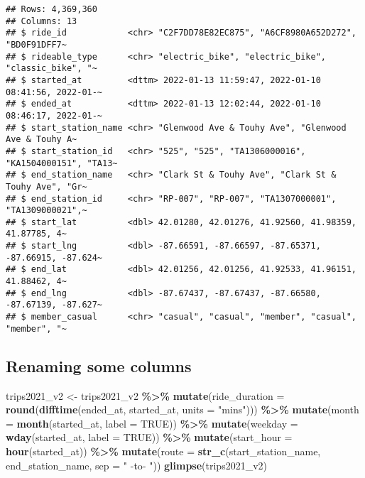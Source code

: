 \documentclass[
]{article}
\newenvironment{Shaded}{\begin{snugshade}}{\end{snugshade}}
\newcommand{\AttributeTok}[1]{\textcolor[rgb]{0.13,0.29,0.53}{#1}}
\newcommand{\ConstantTok}[1]{\textcolor[rgb]{0.56,0.35,0.01}{#1}}
\newcommand{\FunctionTok}[1]{\textcolor[rgb]{0.13,0.29,0.53}{\textbf{#1}}}
\newcommand{\NormalTok}[1]{#1}
\newcommand{\OtherTok}[1]{\textcolor[rgb]{0.56,0.35,0.01}{#1}}
\newcommand{\SpecialCharTok}[1]{\textcolor[rgb]{0.81,0.36,0.00}{\textbf{#1}}}
\newcommand{\StringTok}[1]{\textcolor[rgb]{0.31,0.60,0.02}{#1}}
\begin{document}
\begin{verbatim}
## Rows: 4,369,360
## Columns: 13
## $ ride_id            <chr> "C2F7DD78E82EC875", "A6CF8980A652D272", "BD0F91DFF7~
## $ rideable_type      <chr> "electric_bike", "electric_bike", "classic_bike", "~
## $ started_at         <dttm> 2022-01-13 11:59:47, 2022-01-10 08:41:56, 2022-01-~
## $ ended_at           <dttm> 2022-01-13 12:02:44, 2022-01-10 08:46:17, 2022-01-~
## $ start_station_name <chr> "Glenwood Ave & Touhy Ave", "Glenwood Ave & Touhy A~
## $ start_station_id   <chr> "525", "525", "TA1306000016", "KA1504000151", "TA13~
## $ end_station_name   <chr> "Clark St & Touhy Ave", "Clark St & Touhy Ave", "Gr~
## $ end_station_id     <chr> "RP-007", "RP-007", "TA1307000001", "TA1309000021",~
## $ start_lat          <dbl> 42.01280, 42.01276, 41.92560, 41.98359, 41.87785, 4~
## $ start_lng          <dbl> -87.66591, -87.66597, -87.65371, -87.66915, -87.624~
## $ end_lat            <dbl> 42.01256, 42.01256, 41.92533, 41.96151, 41.88462, 4~
## $ end_lng            <dbl> -87.67437, -87.67437, -87.66580, -87.67139, -87.627~
## $ member_casual      <chr> "casual", "casual", "member", "casual", "member", "~
\end{verbatim}

\hypertarget{renaming-some-columns}{%
\subsection{Renaming some columns}\label{renaming-some-columns}}

\begin{Shaded}
\begin{Highlighting}[]
\NormalTok{trips2021\_v2 }\OtherTok{\textless{}{-}}\NormalTok{ trips2021\_v2 }\SpecialCharTok{\%\textgreater{}\%} 
  \FunctionTok{mutate}\NormalTok{(}\AttributeTok{ride\_duration =} \FunctionTok{round}\NormalTok{(}\FunctionTok{difftime}\NormalTok{(ended\_at, started\_at, }\AttributeTok{units =} \StringTok{"mins"}\NormalTok{))) }\SpecialCharTok{\%\textgreater{}\%} 
  \FunctionTok{mutate}\NormalTok{(}\AttributeTok{month =} \FunctionTok{month}\NormalTok{(started\_at, }\AttributeTok{label =} \ConstantTok{TRUE}\NormalTok{)) }\SpecialCharTok{\%\textgreater{}\%} 
  \FunctionTok{mutate}\NormalTok{(}\AttributeTok{weekday =} \FunctionTok{wday}\NormalTok{(started\_at, }\AttributeTok{label =} \ConstantTok{TRUE}\NormalTok{)) }\SpecialCharTok{\%\textgreater{}\%} 
  \FunctionTok{mutate}\NormalTok{(}\AttributeTok{start\_hour =} \FunctionTok{hour}\NormalTok{(started\_at)) }\SpecialCharTok{\%\textgreater{}\%} 
  \FunctionTok{mutate}\NormalTok{(}\AttributeTok{route =} \FunctionTok{str\_c}\NormalTok{(start\_station\_name, end\_station\_name, }\AttributeTok{sep =} \StringTok{" {-}to{-} "}\NormalTok{))}
\FunctionTok{glimpse}\NormalTok{(trips2021\_v2)}
\end{Highlighting}
\end{Shaded}
\end{document}
